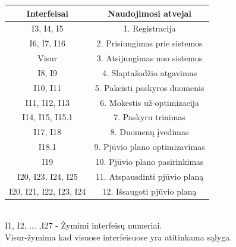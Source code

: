 \documentclass[a4paper,12pt]{article}
\begin{document}
\begin{frame}
\centering
\begin{tabular}{|c|c|}
\hline
\textbf{Interfeisai} 			& \textbf{Naudojimosi atvejai}                                                    \\ \hline
I3, I4, I5		      			& 1. Registracija                                                                     \\ \hline
I6, I7, I16						& 2. Prisiungimas prie sistemos 	\\ \hline
Visur							& 3. Atsijungimas nuo sistemos	\\ \hline
I8, I9 							& 4. Slaptažodžio atgavimas		\\ \hline	
I10, I11							& 5. Pakeisti paskyros duomenis	\\ \hline
I11, I12, I13					& 6. Mokestis už optimizacija		\\ \hline
I14, I15, I15.1					& 7. Paskyru trinimas				\\ \hline
I17, I18							& 8. Duomenų įvedimas   			\\ \hline
I18.1							& 9. Pjūvio plano optimizavimas	\\ \hline
I19								& 10. Pjūvio plano pasirinkimas	\\ \hline
I20, I23, I24, I25				& 11. Atspausdinti pjūvio planą	\\ \hline
I20, I21, I22, I23, I24			& 12. Išsaugoti pjūvio planą                                                                              \\ \hline

\end{tabular}
\end{frame}
\\
\vspace{0.1cm}
I1, I2, ... ,I27 - Žymimi interfeisų numeriai.\\
Visur-žymima kad visuose interfeisuose yra atitinkama sąlyga.

\clearpage
\end{document}
